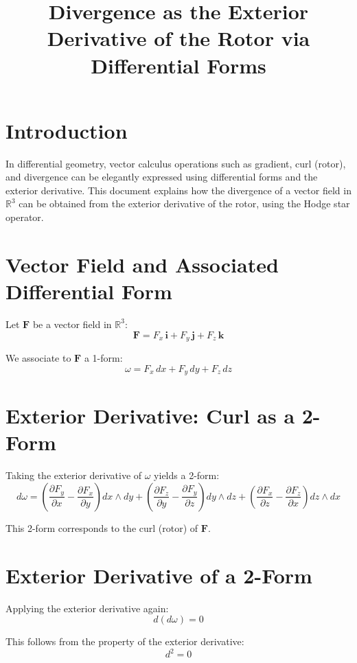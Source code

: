 \documentclass{article}
\title{Divergence as the Exterior Derivative of the Rotor via Differential Forms}
\author{}
\date{}
\begin{document}
\maketitle

\section*{Introduction}

In differential geometry, vector calculus operations such as gradient, curl (rotor), and divergence can be elegantly expressed using differential forms and the exterior derivative. This document explains how the divergence of a vector field in $\mathbb{R}^3$ can be obtained from the exterior derivative of the rotor, using the Hodge star operator.

\section*{Vector Field and Associated Differential Form}

Let $\mathbf{F}$ be a vector field in $\mathbb{R}^3$:
\[
\mathbf{F} = F_x \, \mathbf{i} + F_y \, \mathbf{j} + F_z \, \mathbf{k}
\]

We associate to $\mathbf{F}$ a 1-form:
\[
\omega = F_x \, dx + F_y \, dy + F_z \, dz
\]

\section*{Exterior Derivative: Curl as a 2-Form}

Taking the exterior derivative of $\omega$ yields a 2-form:
\[
d\omega = \left( \frac{\partial F_y}{\partial x} - \frac{\partial F_x}{\partial y} \right) dx \wedge dy + \left( \frac{\partial F_z}{\partial y} - \frac{\partial F_y}{\partial z} \right) dy \wedge dz + \left( \frac{\partial F_x}{\partial z} - \frac{\partial F_z}{\partial x} \right) dz \wedge dx
\]

This 2-form corresponds to the curl (rotor) of $\mathbf{F}$.

\section*{Exterior Derivative of a 2-Form}

Applying the exterior derivative again:
\[
d(d\omega) = 0
\]

This follows from the property of the exterior derivative:
\[
d^2 = 0
\]
\end{document}
